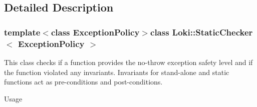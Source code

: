\subsection{Detailed Description}
\subsubsection*{template$<$class Exception\+Policy$>$class Loki\+::\+Static\+Checker$<$ Exception\+Policy $>$}

This class checks if a function provides the no-\/throw exception safety level and if the function violated any invariants. Invariants for stand-\/alone and static functions act as pre-\/conditions and post-\/conditions.

\begin{DoxyParagraph}{Usage}


\end{DoxyParagraph}
